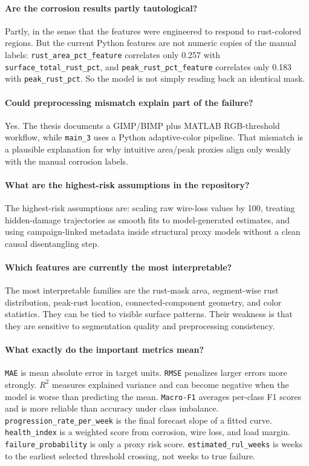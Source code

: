 \documentclass[11pt,a4paper]{article}
\begin{document}
\paragraph{Are the corrosion results partly tautological?}
Partly, in the sense that the features were engineered to respond to rust-colored regions. But the current Python features are not numeric copies of the manual labels: \texttt{rust\_area\_pct\_feature} correlates only 0.257 with \texttt{surface\_total\_rust\_pct}, and \texttt{peak\_rust\_pct\_feature} correlates only 0.183 with \texttt{peak\_rust\_pct}. So the model is not simply reading back an identical mask.

\paragraph{Could preprocessing mismatch explain part of the failure?}
Yes. The thesis documents a GIMP/BIMP plus MATLAB RGB-threshold workflow, while \texttt{main\_3} uses a Python adaptive-color pipeline. That mismatch is a plausible explanation for why intuitive area/peak proxies align only weakly with the manual corrosion labels.

\paragraph{What are the highest-risk assumptions in the repository?}
The highest-risk assumptions are: scaling raw wire-loss values by 100, treating hidden-damage trajectories as smooth fits to model-generated estimates, and using campaign-linked metadata inside structural proxy models without a clean causal disentangling step.

\paragraph{Which features are currently the most interpretable?}
The most interpretable families are the rust-mask area, segment-wise rust distribution, peak-rust location, connected-component geometry, and color statistics. They can be tied to visible surface patterns. Their weakness is that they are sensitive to segmentation quality and preprocessing consistency.

\paragraph{What exactly do the important metrics mean?}
\texttt{MAE} is mean absolute error in target units. \texttt{RMSE} penalizes larger errors more strongly. \(R^2\) measures explained variance and can become negative when the model is worse than predicting the mean. \texttt{Macro-F1} averages per-class F1 scores and is more reliable than accuracy under class imbalance. \texttt{progression\_rate\_per\_week} is the final forecast slope of a fitted curve. \texttt{health\_index} is a weighted score from corrosion, wire loss, and load margin. \texttt{failure\_probability} is only a proxy risk score. \texttt{estimated\_rul\_weeks} is weeks to the earliest selected threshold crossing, not weeks to true failure.
\end{document}
